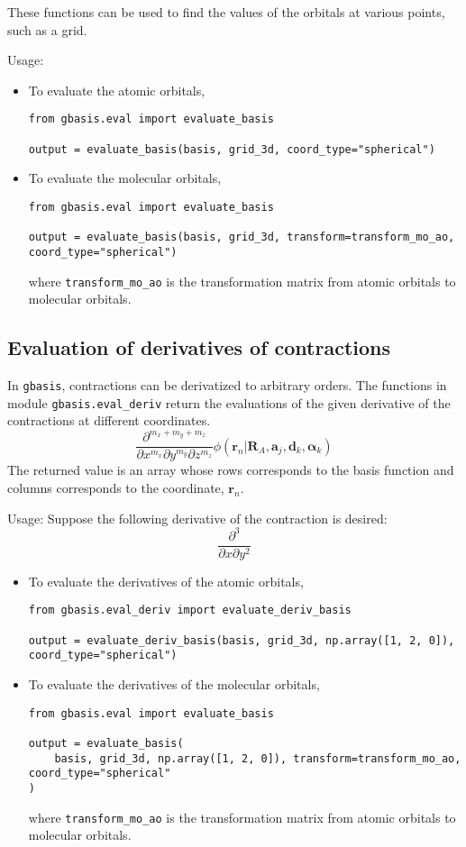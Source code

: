 \documentclass[letterpaper]{article}
\begin{document}
These functions can be used to find the values of the orbitals at various
points, such as a grid.

Usage:
\begin{itemize}
\item To evaluate the atomic orbitals,
\begin{verbatim}
from gbasis.eval import evaluate_basis

output = evaluate_basis(basis, grid_3d, coord_type="spherical")
\end{verbatim}
\item To evaluate the molecular orbitals,
\begin{verbatim}
from gbasis.eval import evaluate_basis

output = evaluate_basis(basis, grid_3d, transform=transform_mo_ao, coord_type="spherical")
\end{verbatim}
  where \verb|transform_mo_ao| is the transformation matrix from atomic orbitals
  to molecular orbitals.
\end{itemize}

\subsection{Evaluation of derivatives of contractions}
In \verb|gbasis|, contractions can be derivatized to arbitrary orders.
The functions in module \verb|gbasis.eval_deriv| return the evaluations of the
given derivative of the contractions at different coordinates.
\begin{equation}
  \frac{\partial^{m_x + m_y + m_z}}{\partial x^{m_x} \partial y^{m_y} \partial z^{m_z}}
  \phi(\mathbf{r}_n | \mathbf{R}_{A}, \mathbf{a}_j, \mathbf{d}_k, \boldsymbol{\alpha}_k)
\end{equation}
The returned value is an array whose rows corresponds to the basis function and
columns corresponds to the coordinate, $\mathbf{r}_n$.

Usage:
Suppose the following derivative of the contraction is desired:
\begin{equation}
  \frac{\partial^3}{\partial x \partial y^2}
\end{equation}
\begin{itemize}
\item To evaluate the derivatives of the atomic orbitals,
\begin{verbatim}
from gbasis.eval_deriv import evaluate_deriv_basis

output = evaluate_deriv_basis(basis, grid_3d, np.array([1, 2, 0]), coord_type="spherical")
\end{verbatim}
\item To evaluate the derivatives of the molecular orbitals,
\begin{verbatim}
from gbasis.eval import evaluate_basis

output = evaluate_basis(
    basis, grid_3d, np.array([1, 2, 0]), transform=transform_mo_ao, coord_type="spherical"
)
\end{verbatim}
  where \verb|transform_mo_ao| is the transformation matrix from atomic orbitals
  to molecular orbitals.
\end{itemize}
\end{document}
